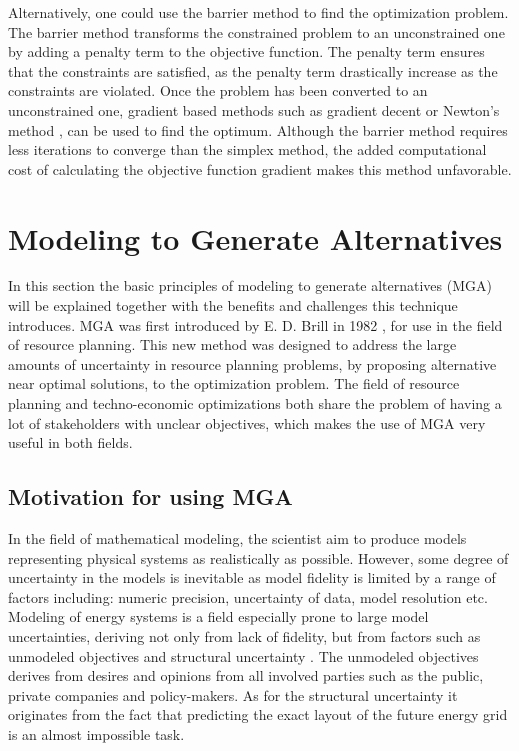 Alternatively, one could use the barrier method to find the optimization problem. The barrier method transforms the constrained problem to an unconstrained one by adding a penalty term to the objective function. The penalty term ensures that the constraints are satisfied, as the penalty term drastically increase as the constraints are violated. Once the problem has been converted to an unconstrained one, gradient based methods such as gradient decent or Newton's method \cite{OpimizationIntroduction}, can be used to find the optimum. Although the barrier method requires less iterations to converge than the simplex method, the added computational cost of calculating the objective function gradient makes this method unfavorable. 


\section{Modeling to Generate Alternatives}\label{sec:MGA}
In this section the basic principles of modeling to generate alternatives (MGA) will be explained together with the benefits and challenges this technique introduces. MGA was first introduced by E. D. Brill in 1982 \cite{Brill_MGA_1982}, for use in the field of resource planning. This new method was designed to address the large amounts of uncertainty in resource planning problems, by proposing alternative near optimal solutions, to the optimization problem. 
The field of resource planning and techno-economic optimizations both share the problem of having a lot of stakeholders with unclear objectives, which makes the use of MGA very useful in both fields. 

\subsection{Motivation for using MGA}

In the field of mathematical modeling, the scientist aim to produce models representing physical systems as realistically as possible. However, some degree of uncertainty in the models is inevitable as model fidelity is limited by a range of factors including: numeric precision, uncertainty of data, model resolution etc. Modeling of energy systems is a field especially prone to large model uncertainties, deriving not only from lack of fidelity, but from factors such as unmodeled objectives and structural uncertainty \cite{DeCarolis_MGA}. The unmodeled objectives derives from desires and opinions from all involved parties such as the public, private companies and policy-makers. As for the structural uncertainty it originates from the fact that predicting the exact layout of the future energy grid is an almost impossible task. 

